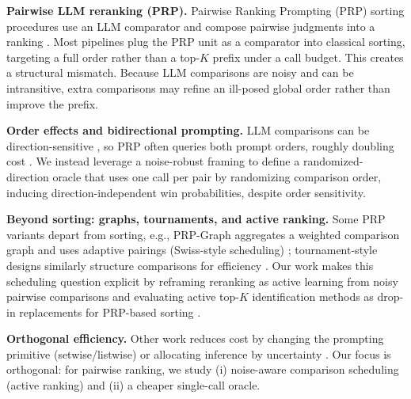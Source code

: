 \documentclass[11pt]{article}
\begin{document}
\noindent\textbf{Pairwise LLM reranking (PRP).}
Pairwise Ranking Prompting (PRP) sorting procedures use an LLM comparator and compose pairwise judgments into a ranking \citep{sun2023chatgptsearch,qin2024pairwise}.
Most pipelines plug the PRP unit as a comparator into classical sorting, targeting a full order rather than a top-$K$ prefix under a call budget.
This creates a structural mismatch. Because LLM comparisons are noisy and can be intransitive, extra comparisons may refine an ill-posed global order rather than improve the prefix.

\noindent\textbf{Order effects and bidirectional prompting.}
LLM comparisons can be direction-sensitive \citep{shi2024judges,yin2025fragile,jeong2025comparativetrap}, so PRP often queries both prompt orders, roughly doubling cost \citep{qin2024pairwise,wu2025realtimeprp}.
We instead leverage a noise-robust framing to define a randomized-direction oracle that uses one call per pair by randomizing comparison order, inducing direction-independent win probabilities, despite order sensitivity.

\noindent\textbf{Beyond sorting: graphs, tournaments, and active ranking.}
Some PRP variants depart from sorting, e.g., PRP-Graph aggregates a weighted comparison graph and uses adaptive pairings (Swiss-style scheduling) \citep{luo-etal-2024-prp}; tournament-style designs similarly structure comparisons for efficiency \citep{chen2024tourrank}. Our work makes this scheduling question explicit by reframing reranking as active learning from noisy pairwise comparisons and evaluating active top-$K$ identification methods as drop-in replacements for PRP-based sorting \citep{heckel2016activeranking,shah2018simplerobust,ren2020bestk,mohajer2017active}.

\noindent\textbf{Orthogonal efficiency.}
Other work reduces cost by changing the prompting primitive (setwise/listwise) or allocating inference by uncertainty \citep{zhuang2024setwise,huang2025tssetrank,wang2025realm}.
Our focus is orthogonal: for pairwise ranking, we study (i) noise-aware comparison scheduling (active ranking) and (ii) a cheaper single-call oracle.



\end{document}
